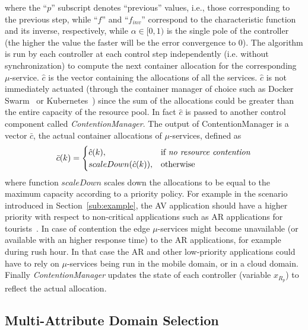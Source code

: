 where the ``$p$'' subscript denotes ``previous'' values, i.e., those corresponding to the previous step, while ``$f$'' and ``$f_{inv}$'' correspond to the characteristic function and its inverse, respectively, while $\alpha \in [0,1)$ is the single pole of the controller (the higher the value the faster will be the error convergence to $0$). The algorithm is run by each controller at each control step independently (i.e. without synchronization) to compute the next container allocation for the corresponding $\mu$-service. $\hat{c}$ is the vector containing the allocations of all the services. $\hat{c}$ is not immediately actuated (through the container manager of choice such as Docker Swarm~\cite{Swarm} or Kubernetes~\cite{Kubernetes}) since the sum of the allocations could be greater than the entire capacity of the resource pool. In fact $\hat{c}$  is passed to another control component called  \textit{ContentionManager}. The  output of ContentionManager is a vector $\bar{c}$, the actual container allocations of $\mu$-services, defined as 
\begin{equation}
\bar{c}(k) =
\begin{cases}
\hat{c}(k),& \text{if \textit{no resource contention}}\\
scaleDown(\hat{c}(k)),              & \text{otherwise}
\end{cases}
\label{eqn:CsysModel-SS}
\end{equation} 
where function $scaleDown$ scales down the allocations to be equal to the maximum capacity according to a priority policy. 
For example in the scenario introduced in Section~\ref{sub:example}, the AV application should have a higher priority with respect to non-critical applications such as AR applications for tourists~\cite{GarrigaMendonca2017}. In case of contention the edge $\mu$-services might become unavailable (or available with an higher response time) to the AR applications, for example during rush hour. In that case the AR and other low-priority applications could have to rely on $\mu$-services being run in the mobile domain, or in a cloud domain. Finally \textit{ContentionManager} updates the state of each controller (variable $x_{R_p}$) to reflect the actual allocation.

\subsection{Multi-Attribute Domain Selection}~\label{sec:cs_allocation}


